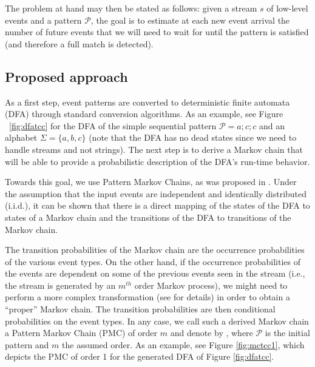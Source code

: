 The problem at hand may then be stated as follows: given a stream $s$ of low-level events and a pattern $\mathcal{P}$, 
the goal is to estimate at each new event arrival the number of future events
that we will need to wait for until the pattern is satisfied (and therefore a full match is detected).

\subsection{Proposed approach}
\label{sec:Event-Forecasting-PMC}
As a first step, event patterns are converted to deterministic finite automata (DFA) through standard conversion algorithms.
As an example, see Figure ~\ref{fig:dfatcc} for the DFA of the simple sequential pattern $\mathcal{P}=a ; c ; c$ and an alphabet $\Sigma=\{a,b,c\}$
(note that the DFA has no dead states since we need to handle streams and not strings).
The next step is to derive a Markov chain that will be able to provide a probabilistic description of the DFA's run-time behavior.
\par Towards this goal, we use Pattern Markov Chains, as was proposed in \cite{nuel_pattern_2008}.
Under the assumption that the input events are independent and identically distributed (i.i.d.), it can be shown that there is a direct mapping of the states of the DFA to states of a Markov chain and the transitions of the DFA to transitions of the Markov chain.
\par The transition probabilities of the Markov chain are the occurrence probabilities of the various event types.
On the other hand, if the occurrence probabilities of the events are dependent on some of the previous events  seen in the stream (i.e., the stream is generated by an $m^{th}$ order Markov process), we might need to perform a more complex transformation 
(see \cite{nuel_pattern_2008} for details)
in order to obtain a ``proper'' Markov chain.
The transition probabilities are then conditional probabilities on the event types.
In any case,
we call such a derived Markov chain a Pattern Markov Chain (PMC) of order $m$
and denote by \pmcmr , where $\mathcal{P}$ is the initial pattern and $m$ the assumed order.
As an example, see Figure \ref{fig:mctcc1}, which depicts the PMC of order 1 for the generated DFA of Figure \ref{fig:dfatcc}.
